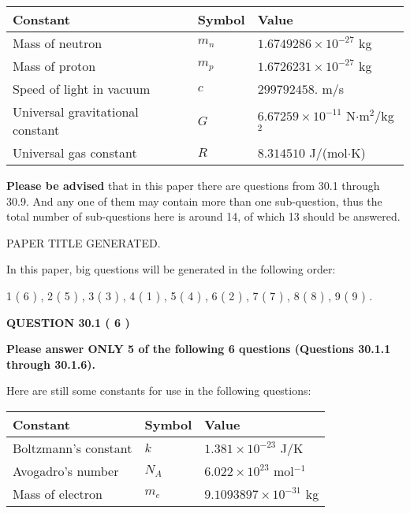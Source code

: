 \documentclass[12pt]{article}
\begin{document}
 
\noindent\begin{tabular}{|l|l|l|}
\hline
Constant & Symbol & Value \\
\hline
Mass of neutron &
$m_n$ &
 $ 1.6749286 \times 10^{-27} $
kg \\
\hline
Mass of proton &
$m_p$ &
 $ 1.6726231 \times 10^{-27} $
kg \\
\hline
Speed of light in vacuum &
$c$ &
 $ 299792458. $
m/s \\
\hline
Universal gravitational constant &
$G$ &
 $ 6.67259 \times 10^{-11} $
N$\cdot $m$^2$/kg$^2$ \\
\hline
Universal gas constant &
$R$ &
 $ 8.314510 $
J/(mol$\cdot $K) \\
\hline
\end{tabular}
 
 
{\textbf{\large{Please be advised}}} that in this paper there are questions from
30.1 through
30.9.
And any one of them may contain more than one sub-question, thus the total number
of sub-questions here is around 14, of which
13 should be answered.
 
\vspace{0.3in}
 
 
   
   
 PAPER TITLE GENERATED.
   
   
   
\vspace{0.2in}
   
In this paper, big questions will be generated in the following order: 
   
   
             1 (           6 )
 ,
             2 (           5 )
 ,
             3 (           3 )
 ,
             4 (           1 )
 ,
             5 (           4 )
 ,
             6 (           2 )
 ,
             7 (           7 )
 ,
             8 (           8 )
 ,
             9 (           9 )
 .
  
\vspace{0.2in}
  
{\textbf{\Large{QUESTION
30.1 
 (           6 )
}}}
  
  
 
{\textbf{\Large{Please answer ONLY
5 of the following
6 questions (Questions
30.1.1 through
30.1.6). }}}
 
Here are still some constants for use in the following questions:
 
 
\noindent\begin{tabular}{|l|l|l|}
\hline
Constant & Symbol & Value \\
\hline
 
Boltzmann's constant &
$k$ &
 $ 1.381 \times 10^{-23} $
J/K \\
\hline
 
Avogadro's number &
$N_A$ &
 $ 6.022 \times 10^{23} $
mol$^{-1}$ \\
\hline
 
Mass of electron &
$m_e$ &
 $ 9.1093897 \times 10^{-31} $
kg \\
\hline
 
\end{tabular}
 
\end{document}
